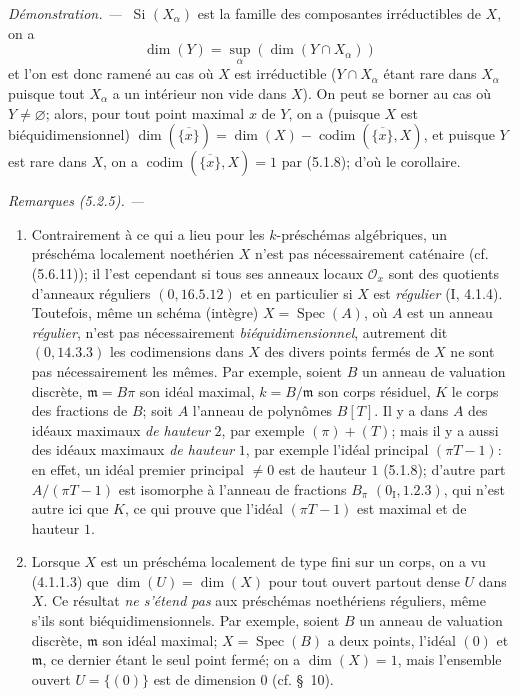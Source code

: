 \documentclass[10pt,oneside]{book}
\newenvironment{remarks}[1][]{%
  \par\medskip\noindent\itshape Remarques (#1). ---\ }{\par}
\newenvironment{proof}{%
  \par\medskip\noindent\textit{Démonstration. ---\ }}{\par}
\begin{document}
\begin{proof}
Si $(X_\alpha)$ est la famille des composantes irréductibles de $X$, on a
\[
\dim(Y)=\sup_\alpha(\dim(Y\cap X_\alpha))
\]
et l'on est donc ramené au cas où $X$ est irréductible ($Y\cap X_\alpha$
étant rare dans $X_\alpha$ puisque tout $X_\alpha$ a un intérieur non vide
dans $X$). On peut se borner au cas où $Y\ne\varnothing$; alors, pour tout
point maximal $x$ de $Y$, on a (puisque $X$ est biéquidimensionnel)
$\dim(\overline{\{x\}})=\dim(X)-\operatorname{codim}(\overline{\{x\}},X)$,
et puisque $Y$ est rare dans $X$, on a
$\operatorname{codim}(\overline{\{x\}},X)=1$ par (5.1.8); d'où le corollaire.
\end{proof}

\begin{remarks}[5.2.5]
\label{IV.2.5.2.5-fr}
\begin{enumerate}
\item[(i)] Contrairement à ce qui a lieu pour les $k$-préschémas algébriques,
un préschéma localement noethérien $X$ n'est pas nécessairement caténaire
(cf. (5.6.11)); il l'est cependant si tous ses anneaux locaux $\mathcal O_x$
sont des quotients d'anneaux réguliers $(0,16.5.12)$ et en particulier si $X$
est \emph{régulier} (I, 4.1.4). Toutefois, même un schéma (intègre)
$X=\operatorname{Spec}(A)$, où $A$ est un anneau \emph{régulier}, n'est pas
nécessairement \emph{biéquidimensionnel}, autrement dit $(0,14.3.3)$ les
codimensions dans $X$ des divers points fermés de $X$ ne sont pas
nécessairement les mêmes. Par exemple, soient $B$ un anneau de valuation
discrète, $\mathfrak m=B\pi$ son idéal maximal, $k=B/\mathfrak m$ son corps
résiduel, $K$ le corps des fractions de $B$; soit $A$ l'anneau de polynômes
$B[T]$. Il y a dans $A$ des idéaux maximaux \emph{de hauteur} $2$, par exemple
$(\pi)+(T)$; mais il y a aussi des idéaux maximaux \emph{de hauteur} $1$, par
exemple l'idéal principal $(\pi T-1)$: en effet, un idéal premier principal
$\ne0$ est de hauteur $1$ (5.1.8); d'autre part
$A/(\pi T-1)$ est isomorphe à l'anneau de fractions $B_\pi$
$(0_{\mathrm I},1.2.3)$, qui n'est autre ici que $K$, ce qui prouve que
l'idéal $(\pi T-1)$ est maximal et de hauteur $1$.

\item[(ii)] Lorsque $X$ est un préschéma localement de type fini sur un corps,
on a vu (4.1.1.3) que $\dim(U)=\dim(X)$ pour tout ouvert partout dense $U$
dans $X$. Ce résultat \emph{ne s'étend pas} aux préschémas noethériens
réguliers, même s'ils sont biéquidimensionnels. Par exemple, soient $B$ un
anneau de valuation discrète, $\mathfrak m$ son idéal maximal;
$X=\operatorname{Spec}(B)$ a deux points, l'idéal $(0)$ et $\mathfrak m$, ce
dernier étant le seul point fermé; on a $\dim(X)=1$, mais l'ensemble ouvert
$U=\{(0)\}$ est de dimension $0$ (cf. \S~10).
\end{enumerate}
\end{remarks}
\end{document}
